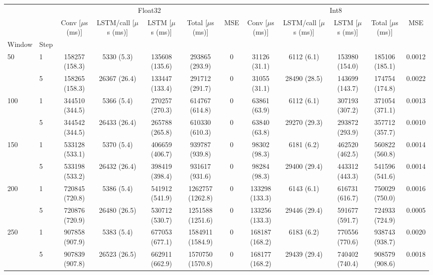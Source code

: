 \begin{tabular}{llcccccccccc}
\toprule
 &  & \multicolumn{5}{c}{Float32} & \multicolumn{5}{c}{Int8} \\
 &  & Conv [$\mu$s (ms)] & LSTM/call [$\mu$s (ms)] & LSTM [$\mu$s (ms)] & Total [$\mu$s (ms)] & MSE & Conv [$\mu$s (ms)] & LSTM/call [$\mu$s (ms)] & LSTM [$\mu$s (ms)] & Total [$\mu$s (ms)] & MSE \\
Window & Step &  &  &  &  &  &  &  &  &  &  \\
\midrule
\multirow[c]{2}{*}{50} & 1 & 158257 (158.3) & 5330 (5.3) & 135608 (135.6) & 293865 (293.9) & 0 & 31126 (31.1) & 6112 (6.1) & 153980 (154.0) & 185106 (185.1) & 0.0012 \\
 & 5 & 158265 (158.3) & 26367 (26.4) & 133447 (133.4) & 291712 (291.7) & 0 & 31055 (31.1) & 28490 (28.5) & 143699 (143.7) & 174754 (174.8) & 0.0022 \\
\multirow[c]{2}{*}{100} & 1 & 344510 (344.5) & 5366 (5.4) & 270257 (270.3) & 614767 (614.8) & 0 & 63861 (63.9) & 6112 (6.1) & 307193 (307.2) & 371054 (371.1) & 0.0013 \\
 & 5 & 344542 (344.5) & 26433 (26.4) & 265788 (265.8) & 610330 (610.3) & 0 & 63840 (63.8) & 29270 (29.3) & 293872 (293.9) & 357712 (357.7) & 0.0010 \\
\multirow[c]{2}{*}{150} & 1 & 533128 (533.1) & 5370 (5.4) & 406659 (406.7) & 939787 (939.8) & 0 & 98302 (98.3) & 6181 (6.2) & 462520 (462.5) & 560822 (560.8) & 0.0014 \\
 & 5 & 533198 (533.2) & 26432 (26.4) & 398419 (398.4) & 931617 (931.6) & 0 & 98284 (98.3) & 29400 (29.4) & 443312 (443.3) & 541596 (541.6) & 0.0014 \\
\multirow[c]{2}{*}{200} & 1 & 720845 (720.8) & 5386 (5.4) & 541912 (541.9) & 1262757 (1262.8) & 0 & 133298 (133.3) & 6143 (6.1) & 616731 (616.7) & 750029 (750.0) & 0.0016 \\
 & 5 & 720876 (720.9) & 26480 (26.5) & 530712 (530.7) & 1251588 (1251.6) & 0 & 133256 (133.3) & 29446 (29.4) & 591677 (591.7) & 724933 (724.9) & 0.0005 \\
\multirow[c]{2}{*}{250} & 1 & 907858 (907.9) & 5383 (5.4) & 677053 (677.1) & 1584911 (1584.9) & 0 & 168187 (168.2) & 6183 (6.2) & 770556 (770.6) & 938743 (938.7) & 0.0020 \\
 & 5 & 907839 (907.8) & 26523 (26.5) & 662911 (662.9) & 1570750 (1570.8) & 0 & 168177 (168.2) & 29439 (29.4) & 740402 (740.4) & 908579 (908.6) & 0.0018 \\

\end{tabular}
